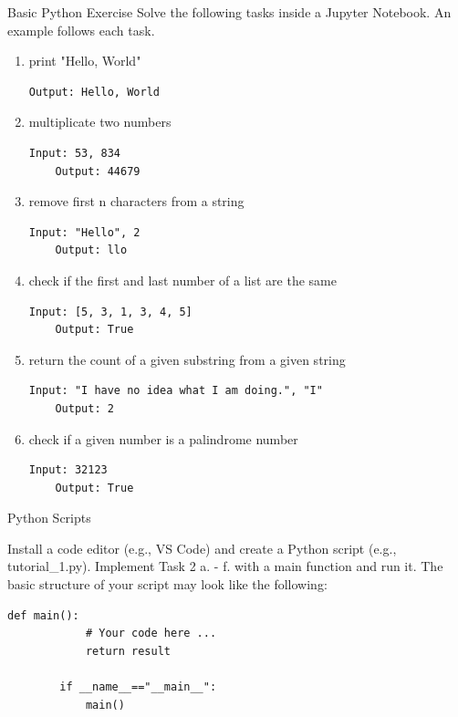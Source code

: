\documentclass[twoside]{article}
\begin{document}
\newpage
\begin{task}{Basic Python Exercise}{}{}
Solve the following tasks inside a Jupyter Notebook. An example follows each task.
\begin{enumerate}
    \item print "Hello, World"
    \begin{lstlisting}[numbers=none]
    Output: Hello, World
    \end{lstlisting}
    
    \item multiplicate two numbers
    \begin{lstlisting}[numbers=none]
    Input: 53, 834
    Output: 44679
    \end{lstlisting}
    
    \item remove first n characters from a string
    \begin{lstlisting}[numbers=none]
    Input: "Hello", 2
    Output: llo
    \end{lstlisting}

    \item check if the first and last number of a list are the same
    \begin{lstlisting}[numbers=none]
    Input: [5, 3, 1, 3, 4, 5]
    Output: True
    \end{lstlisting}
    
    
    \item return the count of a given substring from a given string
    \begin{lstlisting}[numbers=none]
    Input: "I have no idea what I am doing.", "I"
    Output: 2
    \end{lstlisting}
    
    \item check if a given number is a palindrome number
    \begin{lstlisting}[numbers=none]
    Input: 32123
    Output: True
    \end{lstlisting}
    
\end{enumerate}
\end{task}

\newpage
\begin{task}{Python Scripts}{}{}

    Install a code editor (e.g., VS Code) and create a Python script (e.g., tutorial\_1.py). Implement Task 2 a. - f. with a main function and run it.
    The basic structure of your script may look like the following:
    
    \begin{lstlisting}[numbers=none]
        def main():
            # Your code here ...           
            return result

        if __name__=="__main__":
            main()
    \end{lstlisting}

\end{task}
\end{document}
